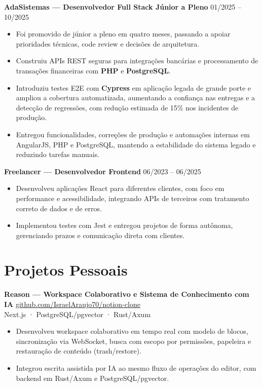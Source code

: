 \documentclass[a4paper,10pt]{article}
\begin{document}
\textbf{AdaSistemas — Desenvolvedor Full Stack Júnior a Pleno} \hfill 01/2025 -- 10/2025
\begin{itemize}[leftmargin=*, itemsep=1pt]
    \item Foi promovido de júnior a pleno em quatro meses, passando a apoiar prioridades técnicas, code review e decisões de arquitetura.
    \item Construiu APIs REST seguras para integrações bancárias e processamento de transações financeiras com \textbf{PHP} e \textbf{PostgreSQL}.
    \item Introduziu testes E2E com \textbf{Cypress} em aplicação legada de grande porte e ampliou a cobertura automatizada, aumentando a confiança nas entregas e a detecção de regressões, com redução estimada de 15\% nos incidentes de produção.
    \item Entregou funcionalidades, correções de produção e automações internas em AngularJS, PHP e PostgreSQL, mantendo a estabilidade do sistema legado e reduzindo tarefas manuais.
\end{itemize}

\textbf{Freelancer — Desenvolvedor Frontend} \hfill 06/2023 -- 06/2025
\begin{itemize}[leftmargin=*, itemsep=1pt]
    \item Desenvolveu aplicações React para diferentes clientes, com foco em performance e acessibilidade, integrando APIs de terceiros com tratamento correto de dados e de erros.
    \item Implementou testes com Jest e entregou projetos de forma autônoma, gerenciando prazos e comunicação direta com clientes.
\end{itemize}

\section*{Projetos Pessoais}

\textbf{Reason — Workspace Colaborativo e Sistema de Conhecimento com IA} \hfill \href{https://github.com/IsraelAraujo70/notion-clone}{github.com/IsraelAraujo70/notion-clone}\\
Next.js · PostgreSQL/pgvector · Rust/Axum
\begin{itemize}[leftmargin=*, itemsep=1pt]
    \item Desenvolveu workspace colaborativo em tempo real com modelo de blocos, sincronização via WebSocket, busca com escopo por permissões, papeleira e restauração de conteúdo (trash/restore).
    \item Integrou escrita assistida por IA ao mesmo fluxo de operações do editor, com backend em Rust/Axum e PostgreSQL/pgvector.
\end{itemize}
\end{document}
